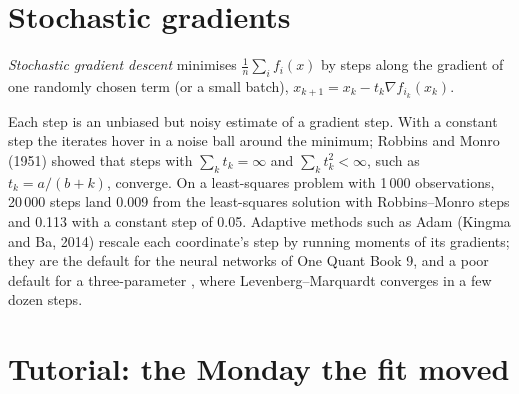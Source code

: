 \section{Stochastic gradients}

\begin{definition}\label{def:qm:numerical-optimisation-in-practice:sgd}
\emph{Stochastic gradient descent} minimises $\frac1n\sum_if_i(x)$ by steps along the gradient of one randomly chosen term (or a small batch),
$x_{k+1} = x_k - t_k\nabla f_{i_k}(x_k)$.
\end{definition}

Each step is an unbiased but noisy estimate of a gradient step. With a constant step the iterates hover in a noise ball around the minimum; Robbins and Monro (1951) showed that steps with
$\sum_kt_k = \infty$ and $\sum_kt_k^2 < \infty$, such as $t_k = a/(b + k)$, converge. On a least-squares problem with 1\,000 observations, 20\,000 steps land 0.009 from the least-squares
solution with Robbins--Monro steps and 0.113 with a constant step of 0.05. Adaptive methods such as Adam (Kingma and Ba, 2014) rescale each coordinate's step by running moments of its
gradients; they are the default for the neural networks of One Quant Book 9, and a poor default for a three-parameter , where Levenberg--Marquardt converges in a few dozen steps.

\section{Tutorial: the Monday the fit moved}\label{tut:qm:numerical-optimisation-in-practice:monday}

